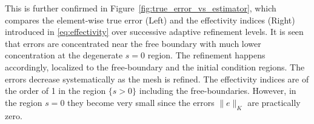 \documentclass[review,11pt]{article}
\numberwithin{equation}{section}
\begin{document}
This is further confirmed in Figure~\ref{fig:true_error_vs_estimator}, which compares the element-wise true error (Left) and the effectivity indices (Right) introduced in \eqref{eq:effectivity} over successive adaptive refinement levels. It is seen that errors are concentrated near the free boundary with much lower concentration at the degenerate $s=0$ region. The refinement happens accordingly, localized to the free-boundary and the initial condition regions. The errors decrease systematically as the mesh is refined. The effectivity indices are of the order of 1 in the region $\{s>0\}$ including the free-boundaries. However, in the region $s=0$ they become very small since the errors $\|e\|_K$ are practically zero. 
\end{document}
